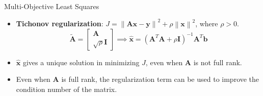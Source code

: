 \documentclass[aspectratio=169]{beamer}
\let\olditem\item
\renewcommand{\item}{\setlength{\itemsep}{\fill}\olditem}
\begin{document}
\begin{frame}[t]{Multi-Objective Least Squares}
\begin{small}
\begin{itemize}
    \item \textbf{Tichonov regularization}: $J = \left\lVert \mathbf{Ax} - \mathbf{y}\right\rVert^2 + \rho \left\lVert \mathbf{x} \right\rVert^2$, where $\rho > 0$.
    \[ \tilde{\mathbf{A}} = \begin{bmatrix*}\mathbf{A}\\\sqrt{\rho}\mathbf{I}\end{bmatrix*} \implies \hat{\mathbf{x}} =  \left(\mathbf{A}^T\mathbf{A} + \rho \mathbf{I}\right)^{-1}\mathbf{A}^T\mathbf{b} \]
    \item $\hat{\mathbf{x}}$ gives a unique solution in minimizing $J$, even when $\mathbf{A}$ is not full rank.
    \item Even when $\mathbf{A}$ is full rank, the regularization term can be used to improve the condition number of the matrix.
\end{itemize}
\end{small}
\end{frame}
\end{document}
